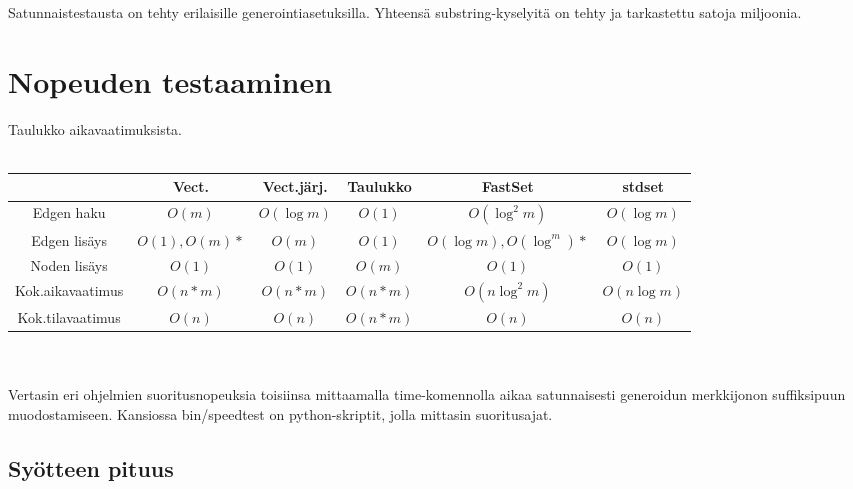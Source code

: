 \documentclass{article}
\begin{document}
        Satunnaistestausta on tehty erilaisille generointiasetuksilla. Yhteensä substring-kyselyitä on tehty ja tarkastettu
        satoja miljoonia.

    \section{Nopeuden testaaminen}


        Taulukko aikavaatimuksista. \\ \\
        \begin{tabular}{c|c|c|c|c|c} \hline
                            &\textbf{Vect.}&\textbf{Vect.järj.}&\textbf{Taulukko}&\textbf{FastSet}        &\textbf{stdset}\\ \hline
            Edgen haku      &$O(m)$        &$O(\log m)$        &$O(1)$           &$O(\log^2 m)$           &$O(\log m)$     \\ \hline
            Edgen lisäys    &$O(1), O(m)*$ &$O(m)$             &$O(1)$           &$O(\log m), O(\log^ m)*$&$O(\log m)$     \\ \hline
            Noden lisäys    &$O(1)$        &$O(1)$             &$O(m)$           &$O(1)$                  &$O(1)$         \\ \hline
            Kok.aikavaatimus&$O(n*m)$      &$O(n*m)$           &$O(n*m)$         &$O(n \log^2 m)$         &$O(n \log m)$   \\ \hline
            Kok.tilavaatimus&$O(n)$        &$O(n)$             &$O(n*m)$         &$O(n)$                  &$O(n)$         \\
        \end{tabular} \\ \\

        Vertasin eri ohjelmien suoritusnopeuksia toisiinsa mittaamalla time-komennolla aikaa satunnaisesti generoidun 
        merkkijonon suffiksipuun muodostamiseen. Kansiossa bin/speedtest on python-skriptit, jolla mittasin suoritusajat.

        \newpage
        \subsection{Syötteen pituus}
        
\end{document}
